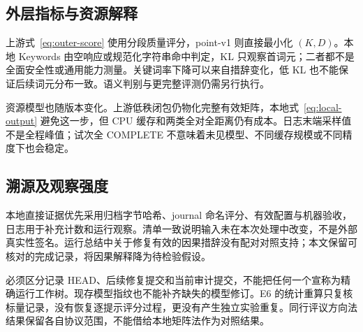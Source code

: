 \subsection{外层指标与资源解释}

上游式~\eqref{eq:outer-score} 使用分段质量评分，point-v1 则直接最小化 $(K,D)$。本地 Keywords 由空响应或规范化字符串命中判定，KL 只观察首词元；二者都不是全面安全性或通用能力测量。关键词率下降可以来自措辞变化，低 KL 也不能保证后续词元分布一致。语义判别与更完整评测仍需另行执行\cite{mazeika2024harmbench}。

资源模型也随版本变化。上游低秩闭包仍物化完整有效矩阵，本地式~\eqref{eq:local-output} 避免这一步，但 CPU 缓存和两类全对全距离仍有成本。日志末端采样值不是全程峰值；试次全 COMPLETE 不意味着未见模型、不同缓存规模或不同精度下也会稳定。

\subsection{溯源及观察强度}

本地直接证据优先采用归档字节哈希、journal 命名评分、有效配置与机器验收，日志用于补充计数和运行观察\cite{ara2026archive}。清单一致说明输入未在本次处理中改变，不是外部真实性签名。运行总结中关于修复有效的因果措辞没有配对对照支持；本文保留可核对的完成记录，将因果解释降为待检验假设。

必须区分记录 HEAD、后续修复提交和当前审计提交，不能把任何一个宣称为精确运行工作树。现存模型指纹也不能补齐缺失的模型修订。E6 的统计重算只复核标量记录，没有恢复逐提示评分过程，更没有产生独立实验重复。同行评议方向法结果保留各自协议范围，不能借给本地矩阵法作为对照结果。


